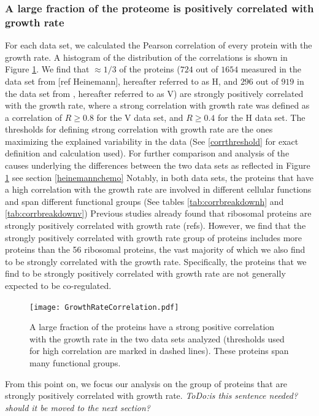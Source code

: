 \documentclass[notitlepage]{article}
\begin{document}
\subsubsection{A large fraction of the proteome is positively correlated with growth rate}
For each data set, we calculated the Pearson correlation of every protein with the growth rate.
A histogram of the distribution of the correlations is shown in Figure \ref{fig:growthcorr}.
We find that $\approx 1/3$ of the proteins ($724$ out of $1654$ measured in the data set from [ref Heinemann], hereafter referred to as H, and $296$ out of $919$ in the data set from \cite{Valgepea2013}, hereafter referred to as V) are strongly positively correlated with the growth rate, where a strong correlation with growth rate was defined as a correlation of $R\geq 0.8$ for the V data set, and $R\geq 0.4$ for the H data set.
The thresholds for defining strong correlation with growth rate are the ones maximizing the explained variability in the data (See \ref{corrthreshold} for exact definition and calculation used).
For further comparison and analysis of the causes underlying the differences between the two data sets as reflected in Figure \ref{fig:growthcorr} see section \ref{heinemannchemo}
Notably, in both data sets, the proteins that have a high correlation with the growth rate are involved in different cellular functions and span different functional groups (See tables \ref{tab:corrbreakdownh} and \ref{tab:corrbreakdownv})
Previous studies already found that ribosomal proteins are strongly positively correlated with growth rate (refs).
However, we find that the strongly positively correlated with growth rate group of proteins includes more proteins than the 56 ribosomal proteins, the vast majority of which we also find to be strongly correlated with the growth rate.
Specifically, the proteins that we find to be strongly positively correlated with growth rate are not generally expected to be co-regulated.

\begin{figure}[h]
\centering
\texttt{[image: GrowthRateCorrelation.pdf]}
\caption{
A large fraction of the proteins have a strong positive correlation with the growth rate in the two data sets analyzed (thresholds used for high correlation are marked in dashed lines).
These proteins span many functional groups.
}
\label{fig:growthcorr}
\end{figure}
From this point on, we focus our analysis on the group of proteins that are strongly positively correlated with growth rate.
\emph{ToDo:is this sentence needed? should it be moved to the next section?}
\end{document}

